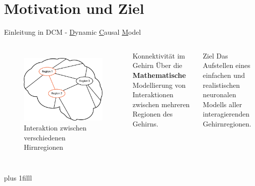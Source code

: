 \documentclass{beamer}
\begin{document}
\section{Motivation und Ziel}
	\begin{frame}{Einleitung in DCM - \underline{D}ynamic \underline{C}ausal \underline{M}odel}
		\begin{columns}
		\column[t]{6cm}
		\begin{figure}
			\centering
			\includegraphics[width=0.85\linewidth]{res/brain_01.eps}
			\\ Interaktion zwischen\\ verschiedenen Hirnregionen
			\label{fig:brain_01}
		\end{figure}
		\column[t]{6cm}
		\begin{block}{\centering Konnektivität im Gehirn}
			\centering
			Über die \textbf{Mathematische} Modellierung von Interaktionen zwischen mehreren Regionen des Gehirns.
		\end{block}
		\vspace{0.5cm}
		\begin{exampleblock}{\centering Ziel}
			 \centering
			 Das Aufstellen eines einfachen und realistischen neuronalen Modells aller interagierenden Gehirnregionen.
		\end{exampleblock}
		\end{columns}
		\vskip0pt plus 1filll
	\end{frame}
	
\end{document}
